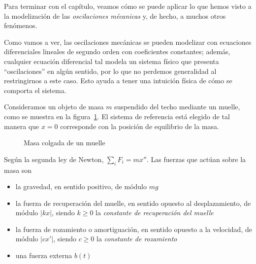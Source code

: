 \documentclass[../main.tex]{subfiles}
\begin{document}
Para terminar con el capítulo, veamos cómo se puede aplicar lo que hemos visto a
la modelización de las \emph{oscilaciones mécanicas} y, de hecho, a muchos otros
fenómenos.

Como vamos a ver, las oscilaciones mecánicas se pueden modelizar con ecuaciones
diferenciales lineales de segundo orden con coeficientes constantes; además,
cualquier ecuación diferencial tal modela un sistema físico que presenta
``oscilaciones'' en algún sentido, por lo que no perdemos generalidad al
restringirnos a este caso. Esto ayuda a tener una intuición física de cómo se
comporta el sistema.

Consideramos un objeto de masa \(m\) suspendido del techo mediante un muelle,
como se muestra en la figura~\ref{fig:muelle}. El sistema de referencia está
elegido de tal manera que \(x=0\) corresponde con la posición de equilibrio de
la masa.

\begin{figure}[ht]
  \centering
  \caption{Masa colgada de un muelle}
  \label{fig:muelle}
\end{figure}

Según la segunda ley de Newton, \(\sum_i F_i = mx''\). Las fuerzas que actúan sobre
la masa son

\begin{itemize}
\item la gravedad, en sentido positivo, de módulo \(mg\)
\item la fuerza de recuperación del muelle, en sentido opuesto al
  desplazamiento, de módulo \(|kx|\), siendo \(k \geq 0\) la \emph{constante de
    recuperación del muelle}
\item la fuerza de rozamiento o amortiguación, en sentido opuesto a la
  velocidad, de módulo \(|cx'|\), siendo \(c \geq 0\) la \emph{constante de rozamiento}
\item una fuerza externa \(b(t)\)
\end{itemize}
\end{document}

